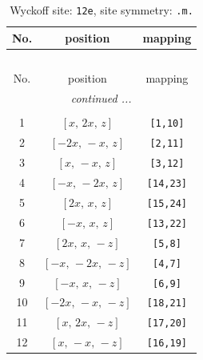 \documentclass[fleqn,8pt]{jsarticle}
\begin{document}
\begin{longtable}{ccc}
\caption{Wyckoff site: {\tt 12e}, site symmetry: {\tt .m.}}
 \\
 \hline \hline
No. & position & mapping \\ \hline \endfirsthead

\multicolumn{2}{l}{\tablename\ \thetable{}} \\
 \hline \hline
No. & position & mapping \\ \hline \endhead

 \hline \hline
\multicolumn{2}{r}{\footnotesize\it continued ...} \\ \endfoot

 \hline \hline
\multicolumn{2}{r}{} \\ \endlastfoot

1 & $\left[ x,\, 2 x,\, z \right]$ & {\tt [1,10]} \\ \hline
2 & $\left[ - 2 x,\, - x,\, z \right]$ & {\tt [2,11]} \\ \hline
3 & $\left[ x,\, - x,\, z \right]$ & {\tt [3,12]} \\ \hline
4 & $\left[ - x,\, - 2 x,\, z \right]$ & {\tt [14,23]} \\ \hline
5 & $\left[ 2 x,\, x,\, z \right]$ & {\tt [15,24]} \\ \hline
6 & $\left[ - x,\, x,\, z \right]$ & {\tt [13,22]} \\ \hline
7 & $\left[ 2 x,\, x,\, - z \right]$ & {\tt [5,8]} \\ \hline
8 & $\left[ - x,\, - 2 x,\, - z \right]$ & {\tt [4,7]} \\ \hline
9 & $\left[ - x,\, x,\, - z \right]$ & {\tt [6,9]} \\ \hline
10 & $\left[ - 2 x,\, - x,\, - z \right]$ & {\tt [18,21]} \\ \hline
11 & $\left[ x,\, 2 x,\, - z \right]$ & {\tt [17,20]} \\ \hline
12 & $\left[ x,\, - x,\, - z \right]$ & {\tt [16,19]} \\
\end{longtable}
\renewcommand{\arraystretch}{1.2}
\end{document}
